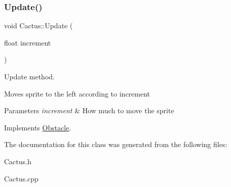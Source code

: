 \subsubsection{\texorpdfstring{Update()}{Update()}}
{\footnotesize\ttfamily void Cactus\+::\+Update (\begin{DoxyParamCaption}\item[{float}]{increment }\end{DoxyParamCaption})\hspace{0.3cm}{\ttfamily [virtual]}}



Update method. 

Moves sprite to the left according to increment 
\begin{DoxyParams}{Parameters}
{\em increment} & How much to move the sprite \\
\hline
\end{DoxyParams}


Implements \mbox{\hyperlink{class_obstacle_ad7bd00104a2c53cfb7421ca5986644af}{Obstacle}}.



The documentation for this class was generated from the following files\+:\begin{DoxyCompactItemize}
\item 
Cactus.\+h\item 
Cactus.\+cpp\end{DoxyCompactItemize}
